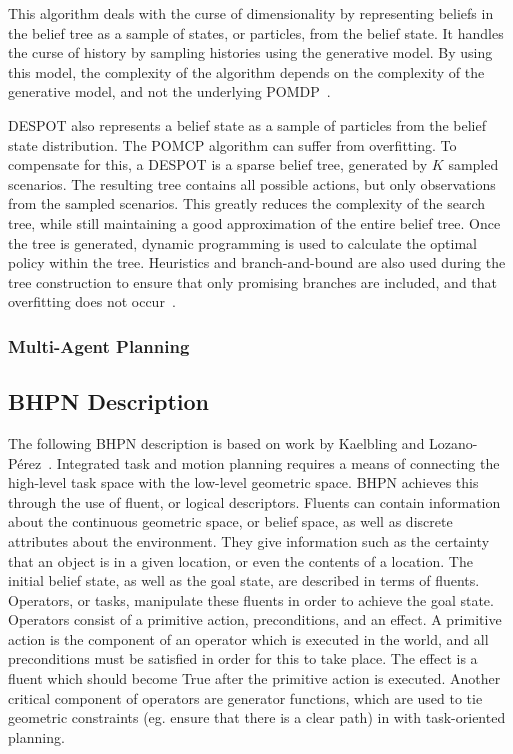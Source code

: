 \documentclass[12pt]{article}
\begin{document}
This algorithm deals with the curse of dimensionality by representing beliefs in the belief tree as a sample of states, or particles, from the belief state. It handles the curse of history by sampling histories using the generative model. By using this model, the complexity of the algorithm depends on the complexity of the generative model, and not the underlying POMDP~\cite{silver_monte-carlo_2010}.

DESPOT also represents a belief state as a sample of particles from the belief state distribution. The POMCP algorithm can suffer from overfitting. To compensate for this, a DESPOT is a sparse belief tree, generated by $K$ sampled scenarios. The resulting tree contains all possible actions, but only observations from the sampled scenarios. This greatly reduces the complexity of the search tree, while still maintaining a good approximation of the entire belief tree. Once the tree is generated, dynamic programming is used to calculate the optimal policy within the tree. Heuristics and branch-and-bound are also used during the tree construction to ensure that only promising branches are included, and that overfitting does not occur~\cite{somani_despot:_2013}.

\subsubsection{Multi-Agent Planning} \label{MAP}

\subsection{BHPN Description} \label{bhpn description}

The following BHPN description is based on work by Kaelbling and Lozano-P{\'e}rez~\cite{kaelbling2012integrated}. Integrated task and motion planning requires a means of connecting the high-level task space with the low-level geometric space. BHPN achieves this through the use of fluent, or logical descriptors. Fluents can contain information about the continuous geometric space, or belief space, as well as discrete attributes about the environment. They give information such as the certainty that an object is in a given location, or even the contents of a location. The initial belief state, as well as the goal state, are described in terms of fluents. Operators, or tasks, manipulate these fluents in order to achieve the goal state. Operators consist of a primitive action, preconditions, and an effect. A primitive action is the component of an operator which is executed in the world, and all preconditions must be satisfied in order for this to take place. The effect is a fluent which should become True after the primitive action is executed. Another critical component of operators are generator functions, which are used to tie geometric constraints (eg. ensure that there is a clear path) in with task-oriented planning. 
\end{document}

